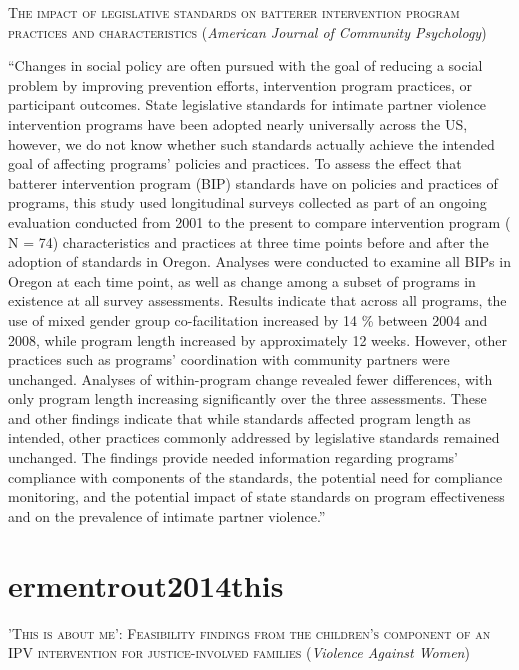 \documentclass[]{tufte-handout}
\begin{document}
\textsc{\large{The impact of legislative standards on batterer intervention program practices and characteristics}}
(\emph{American Journal of Community Psychology})

``Changes in social policy are often pursued with the goal of reducing a
social problem by improving prevention efforts, intervention program
practices, or participant outcomes. State legislative standards for
intimate partner violence intervention programs have been adopted nearly
universally across the US, however, we do not know whether such
standards actually achieve the intended goal of affecting programs'
policies and practices. To assess the effect that batterer intervention
program (BIP) standards have on policies and practices of programs, this
study used longitudinal surveys collected as part of an ongoing
evaluation conducted from 2001 to the present to compare intervention
program ( N = 74) characteristics and practices at three time points
before and after the adoption of standards in Oregon. Analyses were
conducted to examine all BIPs in Oregon at each time point, as well as
change among a subset of programs in existence at all survey
assessments. Results indicate that across all programs, the use of mixed
gender group co-facilitation increased by 14 \% between 2004 and 2008,
while program length increased by approximately 12 weeks. However, other
practices such as programs' coordination with community partners were
unchanged. Analyses of within-program change revealed fewer differences,
with only program length increasing significantly over the three
assessments. These and other findings indicate that while standards
affected program length as intended, other practices commonly addressed
by legislative standards remained unchanged. The findings provide needed
information regarding programs' compliance with components of the
standards, the potential need for compliance monitoring, and the
potential impact of state standards on program effectiveness and on the
prevalence of intimate partner violence.''

\section{\texorpdfstring{\textcolor[HTML]{5b0057}{ermentrout2014this}}{}}\label{section-20}

\textsc{\large{'This is about me': Feasibility findings from the children's component of an IPV intervention for justice-involved families}}
(\emph{Violence Against Women})
\end{document}
